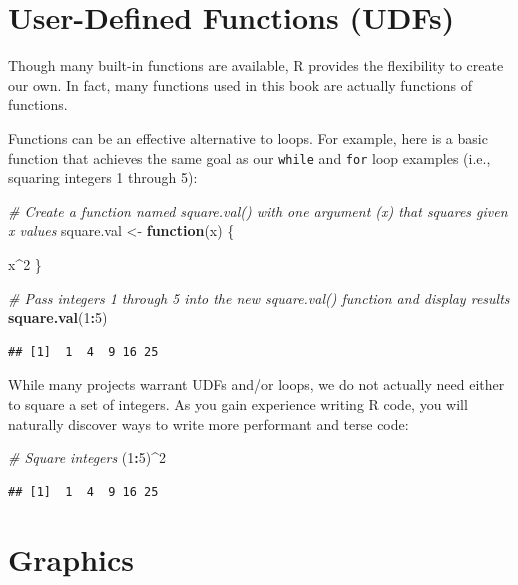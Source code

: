 \documentclass[]{book}
\newenvironment{Shaded}{\begin{snugshade}}{\end{snugshade}}
\newcommand{\CommentTok}[1]{\textcolor[rgb]{0.56,0.35,0.01}{\textit{#1}}}
\newcommand{\ControlFlowTok}[1]{\textcolor[rgb]{0.13,0.29,0.53}{\textbf{#1}}}
\newcommand{\DecValTok}[1]{\textcolor[rgb]{0.00,0.00,0.81}{#1}}
\newcommand{\KeywordTok}[1]{\textcolor[rgb]{0.13,0.29,0.53}{\textbf{#1}}}
\newcommand{\NormalTok}[1]{#1}
\newcommand{\OperatorTok}[1]{\textcolor[rgb]{0.81,0.36,0.00}{\textbf{#1}}}
\newcommand{\StringTok}[1]{\textcolor[rgb]{0.31,0.60,0.02}{#1}}
\begin{document}
\hypertarget{user-defined-functions-udfs}{%
\section{User-Defined Functions (UDFs)}\label{user-defined-functions-udfs}}

Though many built-in functions are available, R provides the flexibility to create our own. In fact, many functions used in this book are actually functions of functions.

Functions can be an effective alternative to loops. For example, here is a basic function that achieves the same goal as our \texttt{while} and \texttt{for} loop examples (i.e., squaring integers 1 through 5):

\begin{Shaded}
\begin{Highlighting}[]
\CommentTok{# Create a function named square.val() with one argument (x) that squares given x values}
\NormalTok{square.val <-}\StringTok{ }\ControlFlowTok{function}\NormalTok{(x) \{}
  
\NormalTok{  x}\OperatorTok{^}\DecValTok{2}
\NormalTok{\}}

\CommentTok{# Pass integers 1 through 5 into the new square.val() function and display results}
\KeywordTok{square.val}\NormalTok{(}\DecValTok{1}\OperatorTok{:}\DecValTok{5}\NormalTok{)}
\end{Highlighting}
\end{Shaded}

\begin{verbatim}
## [1]  1  4  9 16 25
\end{verbatim}

While many projects warrant UDFs and/or loops, we do not actually need either to square a set of integers. As you gain experience writing R code, you will naturally discover ways to write more performant and terse code:

\begin{Shaded}
\begin{Highlighting}[]
\CommentTok{# Square integers}
\NormalTok{(}\DecValTok{1}\OperatorTok{:}\DecValTok{5}\NormalTok{)}\OperatorTok{^}\DecValTok{2}
\end{Highlighting}
\end{Shaded}

\begin{verbatim}
## [1]  1  4  9 16 25
\end{verbatim}

\hypertarget{graphics}{%
\section{Graphics}\label{graphics}}
\end{document}
